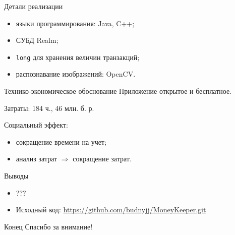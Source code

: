 \documentclass[hyperref={pdftex,unicode}]{beamer}
\begin{document}
\begin{frame}{Детали реализации}
  \begin{itemize}
    \item языки программирования: Java, C++;
    \item СУБД Realm;
    \item \texttt{long} для хранения величин транзакций;
    \item распознавание изображений: OpenCV.
  \end{itemize}
\end{frame}

\begin{frame}{Технико-экономическое обоснование}
  Приложение открытое и бесплатное.

  Затраты: 184 ч., 46 млн. б. р.

  \smallskip
  Социальный эффект:
  \begin{itemize}
  \item сокращение времени на учет;
  \item анализ затрат \( \Rightarrow \) сокращение затрат.
  \end{itemize}
\end{frame}

\begin{frame}{Выводы}
  \begin{itemize}
  \item ???
  \item Исходный код: \url{https://github.com/budnyjj/MoneyKeeper.git}
  \end{itemize}
\end{frame}

\begin{frame}{Конец}
  \centering
  Спасибо за внимание!
\end{frame}
\end{document}
